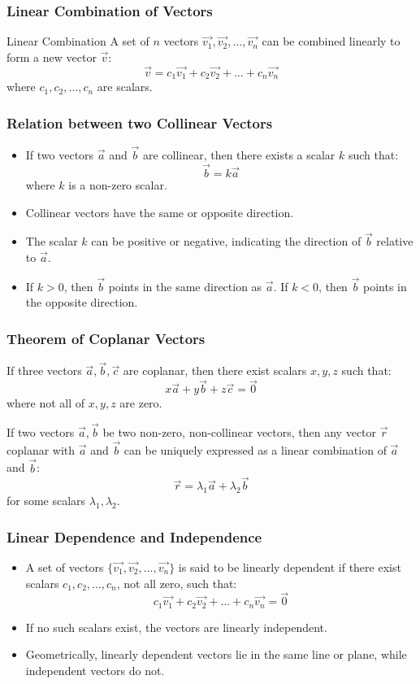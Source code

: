 \begin{frame}
\frametitle{Linear Combination of Vectors}
\begin{block}{Linear Combination}
A set of \(n\) vectors \(\vec{v_1}, \vec{v_2}, \ldots, \vec{v_n}\) can be combined linearly to form a new vector \(\vec{v}\):
\[
\vec{v} = c_1 \vec{v_1} + c_2 \vec{v_2} + \ldots + c_n \vec{v_n}
\]
where \(c_1, c_2, \ldots, c_n\) are scalars.
\end{block}
\end{frame}

\begin{frame}
    \frametitle{Relation between two Collinear Vectors}
    \begin{itemize}
        \item If two vectors \(\vec{a}\) and \(\vec{b}\) are collinear, then there exists a scalar \(k\) such that:
        \[
        \vec{b} = k \vec{a}
        \]
        where \(k\) is a non-zero scalar.
        \item Collinear vectors have the same or opposite direction.
        \item The scalar \(k\) can be positive or negative, indicating the direction of \(\vec{b}\) relative to \(\vec{a}\).
        \item If \(k > 0\), then \(\vec{b}\) points in the same direction as \(\vec{a}\). If \(k < 0\), then \(\vec{b}\) points in the opposite direction.
    \end{itemize}
\end{frame}

\begin{frame}
    \frametitle{Theorem of Coplanar Vectors}

    If three vectors \(\vec{a}, \vec{b}, \vec{c}\) are coplanar, then there exist scalars \(x, y, z\) such that:
    \[
    x \vec{a} + y \vec{b} + z \vec{c} = \vec{0}
    \]
    where not all of \(x, y, z\) are zero.      

    If two vectors \(\vec{a}, \vec{b}\) be two non-zero, non-collinear vectors, then any vector \(\vec{r}\) coplanar with \(\vec{a}\) and \(\vec{b}\) can be uniquely expressed as a linear combination of \(\vec{a}\) and \(\vec{b}\):
    \[
    \vec{r} = \lambda_1 \vec{a} + \lambda_2 \vec{b}
    \]
    for some scalars \(\lambda_1, \lambda_2\).

\end{frame}

\begin{frame}
\frametitle{Linear Dependence and Independence}
\begin{itemize}
    \item A set of vectors \(\{\vec{v_1}, \vec{v_2}, \ldots, \vec{v_n}\}\) is said to be linearly dependent if there exist scalars \(c_1, c_2, \ldots, c_n\), not all zero, such that:
    \[
    c_1 \vec{v_1} + c_2 \vec{v_2} + \ldots + c_n \vec{v_n} = \vec{0}
    \]
    \item If no such scalars exist, the vectors are linearly independent.
    \item Geometrically, linearly dependent vectors lie in the same line or plane, while independent vectors do not.
\end{itemize}                   
\end{frame}

